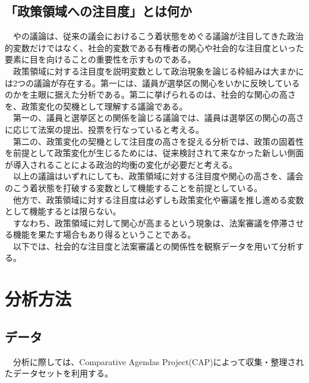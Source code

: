 \documentclass{article}
\begin{document}
\subsection{「政策領域への注目度」とは何か}
　\citet*{Binder2003-bn}や\citet*{Adler2013-ay}の議論は、従来の議会におけるこう着状態をめぐる議論が注目してきた政治的変数だけではなく、社会的変数である有権者の関心や社会的な注目度といった要素に目を向けることの重要性を示すものである。\\
　政策領域に対する注目度を説明変数として政治現象を論じる枠組みは大まかには2つの議論が存在する。第一には、議員が選挙区の関心をいかに反映しているのかを主眼に据えた分析である。第二に挙げられるのは、社会的な関心の高さを、政策変化の契機として理解する議論である。\\
　第一の、議員と選挙区との関係を論じる議論では、議員は選挙区の関心の高さに応じて法案の提出、投票を行なっていると考える。\\
　第二の、政策変化の契機として注目度の高さを捉える分析では、政策の固着性を前提として政策変化が生じるためには、従来検討されて来なかった新しい側面が導入されることによる政治的均衡の変化が必要だと考える。\citep*{Baumgartner1993-bc}\\
　以上の議論はいずれにしても、政策領域に対する注目度や関心の高さを、議会のこう着状態を打破する変数として機能することを前提としている。\\
　他方で、政策領域に対する注目度は必ずしも政策変化や審議を推し進める変数として機能するとは限らない。\\
　すなわち、政策領域に対して関心が高まるという現象は、法案審議を停滞させる機能を果たす場合もあり得るということである。\\
　以下では、社会的な注目度と法案審議との関係性を観察データを用いて分析する。\\

\section{分析方法}
\subsection{データ}
　分析に際しては、Comparative Agendas Project(CAP)によって収集・整理されたデータセットを利用する。\\
\end{document}
